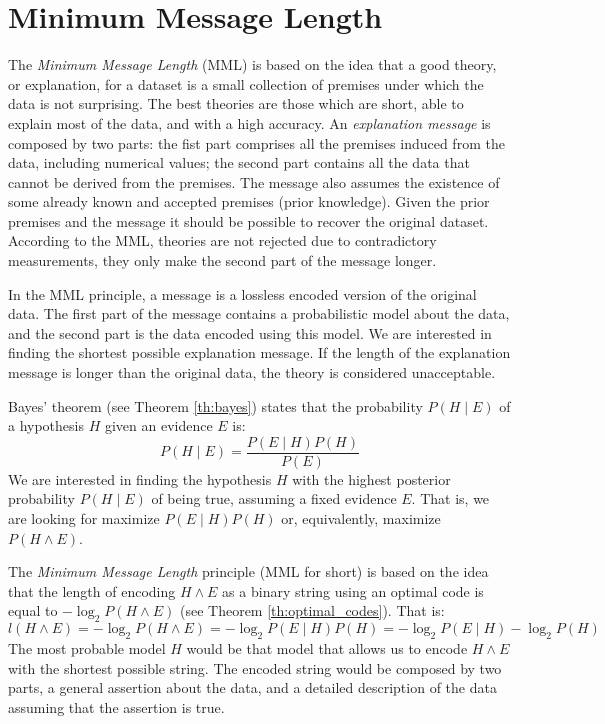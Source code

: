 %
%
\section{Minimum Message Length}
\label{sec:MML}

The \emph{Minimum Message Length} (MML) is based on the idea that a good theory, or explanation, for a dataset is a small collection of premises under which the data is not surprising. The best theories are those which are short, able to explain most of the data, and with a high accuracy. An \emph{explanation message} is composed by two parts: the fist part comprises all the premises induced from the data, including numerical values; the second part contains all the data that cannot be derived from the premises. The message also assumes the existence of some already known and accepted premises (prior knowledge). Given the prior premises and the message it should be possible to recover the original dataset. According to the MML, theories are not rejected due to contradictory measurements, they only make the second part of the message longer.

In the MML principle, a message is a lossless encoded version of the original data. The first part of the message contains a probabilistic model about the data, and the second part is the data encoded using this model. We are interested in finding the shortest possible explanation message. If the length of the explanation message is longer than the original data, the theory is considered unacceptable.

Bayes' theorem (see Theorem \ref{th:bayes}) states that the probability $P(H \mid E)$ of a hypothesis $H$ given an evidence $E$ is:
\[
P(H \mid E) = \frac{ P( E \mid H ) P(H) }{ P(E) }
\]
We are interested in finding the hypothesis $H$ with the highest posterior probability $P(H \mid E)$ of being true, assuming a fixed evidence $E$. That is, we are looking for maximize $P( E \mid H ) P(H)$ or, equivalently, maximize $P ( H \wedge E )$.

The \emph{Minimum Message Length} principle (MML for short) is based on the idea that the length of encoding $H \wedge E$ as a binary string using an optimal code is equal to $- \log_2 P ( H \wedge E )$ (see Theorem \ref{th:optimal_codes}). That is:
\[
l(H \wedge E) = - \log_2 P ( H \wedge E ) = - \log_2 P( E \mid H ) P(H) = - \log_2 P( E \mid H ) - \log_2 P(H)
\]
The most probable model $H$ would be that model that allows us to encode $H \wedge E$ with the shortest possible string. The encoded string would be composed by two parts, a general assertion about the data, and a detailed description of the data assuming that the assertion is true.

